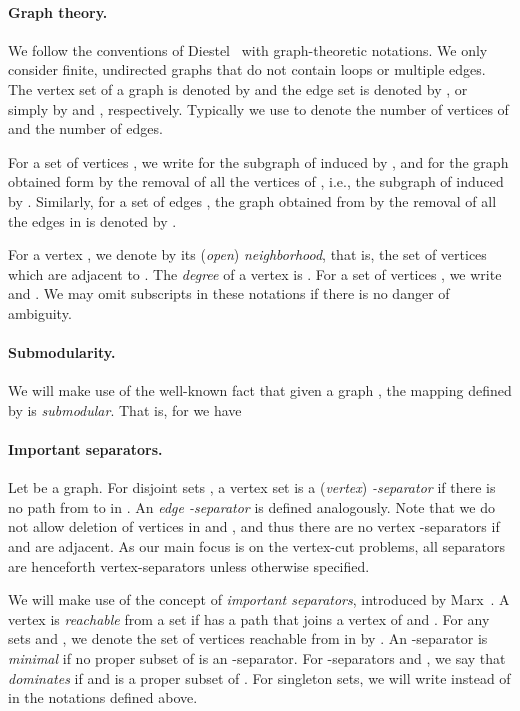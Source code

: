 \documentclass[a4paper,11pt]{article}
\theoremstyle{definition}
\theoremstyle{remark}
\begin{document}
\paragraph{Graph theory.} We follow the conventions of Diestel~\cite{Diestel10} with graph-theoretic notations. 
We only consider finite, undirected graphs that do not contain loops or multiple
edges.
The vertex set of a graph  is denoted by  and  
the edge set is denoted by , or simply by  and , respectively.
Typically we use  to denote the number of vertices of  and  the number of edges.

For a set of vertices , we write
 for the subgraph of  induced by ,
and  for the graph obtained form  by the removal of all the vertices of , i.e., the subgraph of  induced by .
Similarly, for a set of edges , the graph obtained from  by the removal of all the edges in  is denoted by .

For a vertex , we denote by  its
(\emph{open}) \emph{neighborhood}, that is, the set of vertices which are
adjacent to . The \emph{degree} of a vertex  is .
For a set of vertices , we write  and
. 
We may omit subscripts in these notations if there is no danger of ambiguity.

\paragraph{Submodularity.} We will make use of the well-known fact that given a graph , the mapping  defined by  is \emph{submodular}. That is, for  we have


\paragraph{Important separators.} Let  be a graph. For disjoint sets , a vertex set  is a (\emph{vertex}) \emph{-separator} if there is no path from  to  in . An \emph{edge -separator}  is defined analogously. 
Note that we do not allow deletion of vertices in  and , and thus there are no vertex -separators if  and  are adjacent.
As our main focus is on the vertex-cut problems, all separators are henceforth vertex-separators unless otherwise specified.

We will make use of the concept of \emph{important separators}, introduced by Marx~\cite{marx2006parameterized}.
A vertex  is \emph{reachable} from a set  if  has a path that joins a vertex of  and . 
For any sets  and , we denote the set of vertices reachable from  in  by .
An -separator  is \emph{minimal} if no proper subset of  is an -separator. For -separators  and , we say that  \emph{dominates}  if  and  is a proper subset of .
For singleton sets, we will write  instead of  in the notations defined above.
\end{document}
